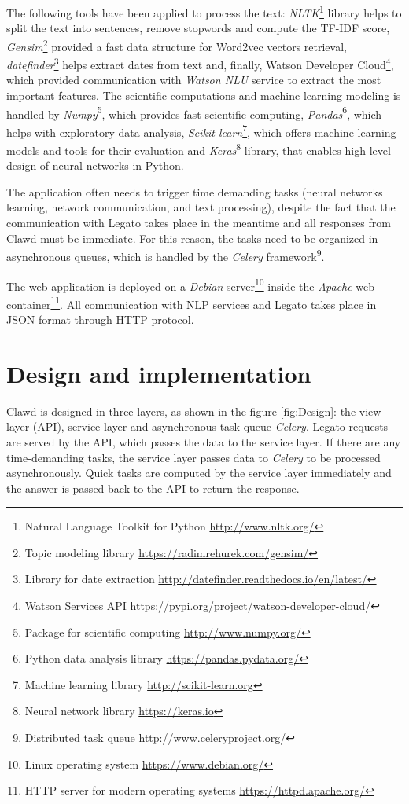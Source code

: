 \documentclass[
  digital, %
  notable,   %
  nolof,     %
  nolot,     %
]{fithesis3}
\begin{document}
The following tools have been applied to process the text:
\textit{NLTK}\footnote{Natural Language Toolkit for Python \url{http://www.nltk.org/}} library helps to split the text into sentences, remove stopwords and compute the TF-IDF score, 
\textit{Gensim}\footnote{Topic modeling library \url{https://radimrehurek.com/gensim/}} provided a fast data structure for Word2vec vectors retrieval, \textit{datefinder}\footnote{Library for date extraction \url{http://datefinder.readthedocs.io/en/latest/}}
helps extract dates from text and, finally,
Watson Developer Cloud\footnote{Watson Services API \url{https://pypi.org/project/watson-developer-cloud/}}, which provided communication with \textit{Watson NLU} service to extract the most important features.
The scientific computations and machine learning modeling is handled by \textit{Numpy}\footnote{Package for scientific computing \url{http://www.numpy.org/}}, which provides fast scientific computing,
\textit{Pandas}\footnote{Python data analysis library \url{https://pandas.pydata.org/}}, which helps with exploratory data analysis,
\textit{Scikit-learn}\footnote{Machine learning library \url{http://scikit-learn.org}}, which offers machine learning models and tools for their evaluation and
\textit{Keras}\footnote{Neural network library \url{https://keras.io}} library, that enables high-level design of neural networks in Python.

The application often needs to trigger time demanding tasks (neural networks learning, network communication, and text processing), despite the fact that the communication with Legato takes place in the meantime and all responses from Clawd must be immediate.
For this reason, the tasks need to be organized in asynchronous queues, which is handled by the \textit{Celery} framework\footnote{Distributed task queue \url{http://www.celeryproject.org/}}.

The web application is deployed on a \textit{Debian} server\footnote{Linux operating system \url{https://www.debian.org/}} inside the \textit{Apache} web container\footnote{HTTP server for modern operating systems \url{https://httpd.apache.org/}}.
All communication with NLP services and Legato takes place in JSON format through HTTP protocol.

\section{Design and implementation}
Clawd is designed in three layers, as shown in the figure \ref{fig:Design}: the view layer (API), service layer and asynchronous task queue \textit{Celery}.
Legato requests are served by the API, which passes the data to the service layer.
If there are any time-demanding tasks, the service layer passes data to \textit{Celery} to be processed asynchronously.
Quick tasks are computed by the service layer immediately and the answer is passed back to the API to return the response.
\end{document}
